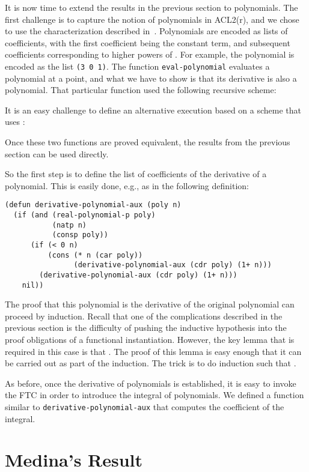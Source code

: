 \documentclass[copyright,creativecommons]{eptcs}
\begin{document}
It is now time to extend the results in the previous section to
polynomials. The first challenge is to capture the notion of
polynomials in ACL2(r), and we chose to use the characterization 
described in~\cite{GaCo:cantor-trio}. Polynomials are encoded as lists
of coefficients, with the first coefficient being the constant term,
and subsequent coefficients corresponding to higher powers of . For
example, the polynomial  is encoded as the list \texttt{(3 0 1)}.
The function \texttt{eval-polynomial} evaluates a polynomial at a point, and
what we have to show is that its derivative is also a polynomial.
That particular function used the following recursive scheme:

It is an easy challenge to define an alternative execution based on a
scheme that uses :

Once these two functions are proved equivalent, the results from the
previous section can be used directly.

So the first step is to define the list of coefficients of the
derivative of a polynomial. This is easily done, e.g., as in the
following definition:
\begin{lstlisting}
(defun derivative-polynomial-aux (poly n)
  (if (and (real-polynomial-p poly)
           (natp n)
           (consp poly))
      (if (< 0 n)
          (cons (* n (car poly))
                (derivative-polynomial-aux (cdr poly) (1+ n)))
        (derivative-polynomial-aux (cdr poly) (1+ n)))
    nil))
\end{lstlisting}
The proof that this polynomial is the derivative of the original
polynomial can proceed by induction. Recall that one of the
complications described in the previous section is the difficulty of
pushing the inductive hypothesis into the proof obligations of a
functional instantiation. However, the key lemma that is required in
this case is that . The proof of this lemma
is easy enough that it can be carried out as part of the
induction. The trick is to do induction such that .

As before, once the derivative of polynomials is established, it is 
easy to invoke the FTC in order to introduce the integral of
polynomials. We defined a function similar to
\texttt{derivative-polynomial-aux} that computes the coefficient of
the integral.

\section{Medina's Result}
\label{medina}
\end{document}
